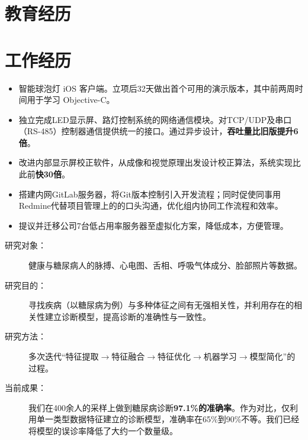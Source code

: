 \documentclass[11pt,a4paper]{moderncv/moderncv}
\begin{document}
\maketitle


\section{教育经历}


\section{工作经历}
{
\begin{itemize}
	\item 智能球泡灯 iOS 客户端。立项后32天做出首个可用的演示版本，其中前两周时间用于学习 Objective-C。
	\item 独立完成LED显示屏、路灯控制系统的网络通信模块。对TCP/UDP及串口（RS-485）控制器通信提供统一的接口。通过异步设计，\textbf{吞吐量比旧版提升6倍}。
	\item 改进内部显示屏校正软件，从成像和视觉原理出发设计校正算法，系统实现比此前\textbf{快30倍}。
	\item 搭建内网GitLab服务器，将Git版本控制引入开发流程；同时促使同事用Redmine代替项目管理上的的口头沟通，优化组内协同工作流程和效率。
	\item 提议并迁移公司7台低占用率服务器至虚拟化方案，降低成本，方便管理。
\end{itemize}
}

{
\begin{description}
	\item[研究对象：] 健康与糖尿病人的脉搏、心电图、舌相、呼吸气体成分、脸部照片等数据。
	\item[研究目的：] 寻找疾病（以糖尿病为例）与多种体征之间有无强相关性，并利用存在的相关性建立诊断模型，提高诊断的准确性与一致性。
	\item[研究方法：] 多次迭代``特征提取$\rightarrow$特征融合$\rightarrow$特征优化$\rightarrow$机器学习$\rightarrow$模型简化''的过程。
	\item[当前成果：] 我们在400余人的采样上做到糖尿病诊断\textbf{97.1\%的准确率}。作为对比，仅利用单一类型数据特征建立的诊断模型，准确率在65\%到90\%不等。我们已经将模型的误诊率降低了大约一个数量级。
\end{description}
}
\end{document}
